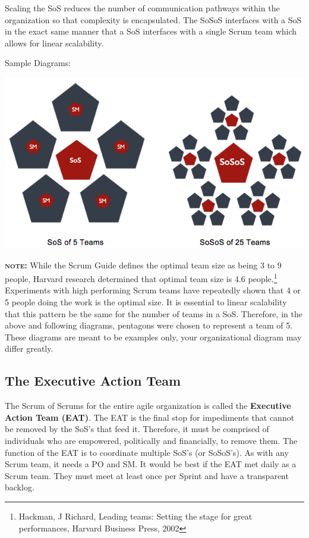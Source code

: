 \documentclass[12pt,a4paper,parskip=full]{scrartcl}
\begin{document}
Scaling the SoS reduces the number of communication pathways within the
organization so that complexity is encapsulated. The SoSoS interfaces with
a SoS in the exact same manner that a SoS interfaces with a single Scrum
team which allows for linear scalability.

\pagebreak
Sample Diagrams:

\includegraphics[width=1.0\linewidth]{Sos-R2.png}

\textbf{\textsc{note:}} While the Scrum Guide defines the optimal team size as being
3 to 9 people, Harvard research determined that optimal team size is 4.6
people.\footnote{Hackman, J Richard, Leading teams: Setting the stage for
great performances, Harvard Business Press, 2002} Experiments with high
performing Scrum teams have repeatedly shown that 4 or 5 people doing the
work is the optimal size. It is essential to linear scalability that this
pattern be the same for the number of teams in a SoS. Therefore, in the
above and following diagrams, pentagons were chosen to represent a team of
5. These diagrams are meant to be examples only, your organizational
diagram may differ greatly.

\subsection{The Executive Action Team}
The Scrum of Scrums for the entire agile organization is called the
\textbf{Executive Action Team (EAT)}. The EAT is the final stop for
impediments that cannot be removed by the SoS's that feed it. Therefore, it
must be comprised of individuals who are empowered, politically and
financially, to remove them. The function of the EAT is to coordinate
multiple SoS's (or SoSoS's). As with any Scrum team, it needs a PO and SM.
It would be best if the EAT met daily as a Scrum team. They must meet at
least once per Sprint and have a transparent backlog.
\end{document}
